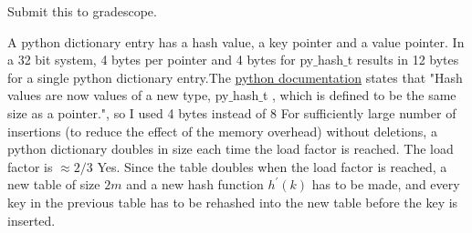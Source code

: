 \documentclass[12pt,twoside]{article}
\begin{document}
\begin{problems}
\begin{problemparts}
\begin{itemize}
\end{itemize}
\end{problemparts}
\clearpage

\problem Submit this to gradescope. %

\begin{problemparts}
\problempart A python dictionary entry has a hash value, a key pointer and a value pointer. In a 32 bit system, 4 bytes per pointer and 4 bytes for py$ \_ $hash$\_$t  results in 12 bytes for a single python dictionary entry.The \href{https://docs.python.org/3/whatsnew/3.2.html}{python documentation} states that "Hash values are now values of a new type, py$ \_ $hash$\_$t , which is defined to be the same size as a pointer.", so I used 4 bytes instead of 8  
\problempart For sufficiently large number of insertions (to reduce the effect of the memory overhead) without deletions, a python dictionary doubles in size each time the load factor is reached.
\problempart The load factor is $\approx 2/3$ 
\problempart Yes. Since the table doubles when the load factor is reached, a new table of size $2m$ and a new hash function $h^{'}(k)$ has to be made, and every key in the previous table has to be rehashed into the new table before the key is inserted.


\end{problemparts}
\end{problems}
\end{document}
